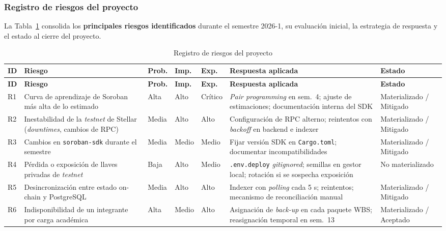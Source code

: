 \documentclass[12pt,oneside]{report}
\begin{document}
      \subsubsection{Registro de riesgos del proyecto}
      La Tabla~\ref{tab:registro-riesgos} consolida los \textbf{principales riesgos identificados} durante el semestre 2026-1, su evaluación inicial, la estrategia de respuesta y el estado al cierre del proyecto.

      \begin{longtable}{@{}p{0.6cm} p{3.8cm} p{1.0cm} p{1.0cm} p{1.0cm} p{4.6cm} p{1.5cm}@{}}
        \caption{Registro de riesgos del proyecto}
        \label{tab:registro-riesgos}\\
        \toprule
        \textbf{ID} & \textbf{Riesgo} & \textbf{Prob.} & \textbf{Imp.} & \textbf{Exp.} & \textbf{Respuesta aplicada} & \textbf{Estado}\\
        \midrule
        \endfirsthead
        \toprule
        \textbf{ID} & \textbf{Riesgo} & \textbf{Prob.} & \textbf{Imp.} & \textbf{Exp.} & \textbf{Respuesta aplicada} & \textbf{Estado}\\
        \midrule
        \endhead
        \bottomrule
        \endfoot
        R1 & Curva de aprendizaje de Soroban más alta de lo estimado & Alta & Alto & Crítico & \textit{Pair programming} en sem.~4; ajuste de estimaciones; documentación interna del SDK & Materializado / Mitigado\\
        R2 & Inestabilidad de la \textit{testnet} de Stellar (\textit{downtimes}, cambios de RPC) & Media & Alto & Alto & Configuración de RPC alterno; reintentos con \textit{backoff} en backend e indexer & Materializado / Mitigado\\
        R3 & Cambios en \texttt{soroban-sdk} durante el semestre & Media & Medio & Medio & Fijar versión SDK en \texttt{Cargo.toml}; documentar incompatibilidades & Materializado / Mitigado\\
        R4 & Pérdida o exposición de llaves privadas de \textit{testnet} & Baja & Alto & Medio & \texttt{.env.deploy} \textit{gitignored}; semillas en gestor local; rotación si se sospecha exposición & No materializado\\
        R5 & Desincronización entre estado on-chain y PostgreSQL & Media & Alto & Alto & Indexer con \textit{polling} cada 5 s; reintentos; mecanismo de reconciliación manual & Materializado / Mitigado\\
        R6 & Indisponibilidad de un integrante por carga académica & Alta & Medio & Alto & Asignación de \textit{back-up} en cada paquete WBS; reasignación temporal en sem.~13 & Materializado / Aceptado\\

\end{longtable}
\end{document}
